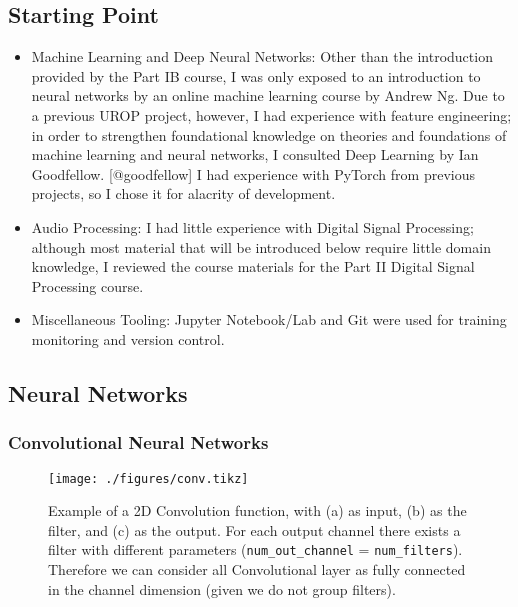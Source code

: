 \documentclass[]{article}
\begin{document}
\hypertarget{starting-point}{%
\subsection{Starting Point}\label{starting-point}}

\begin{itemize}
\item
  Machine Learning and Deep Neural Networks: Other than the introduction
  provided by the Part IB course, I was only exposed to an introduction
  to neural networks by an online machine learning course by Andrew Ng.
  Due to a previous UROP project, however, I had experience with feature
  engineering; in order to strengthen foundational knowledge on theories
  and foundations of machine learning and neural networks, I consulted
  Deep Learning by Ian Goodfellow. {[}@goodfellow{]} I had experience
  with PyTorch from previous projects, so I chose it for alacrity of
  development.
\item
  Audio Processing: I had little experience with Digital Signal
  Processing; although most material that will be introduced below
  require little domain knowledge, I reviewed the course materials for
  the Part II Digital Signal Processing course.
\item
  Miscellaneous Tooling: Jupyter Notebook/Lab and Git were used for
  training monitoring and version control.
\end{itemize}

\hypertarget{neural-networks}{%
\subsection{Neural Networks}\label{neural-networks}}

\hypertarget{convolutional-neural-networks}{%
\subsubsection{Convolutional Neural
Networks}\label{convolutional-neural-networks}}

\begin{figure}[h]
    \texttt{[image: ./figures/conv.tikz]}
    \centering
    \caption{Example of a 2D Convolution function, with (a) as input, (b) as the filter, and (c) as the output. For each output channel there exists a filter with different parameters (\texttt{num\_out\_channel} = \texttt{num\_filters}). Therefore we can consider all Convolutional layer as fully connected in the channel dimension (given we do not group filters).}
\end{figure}
\end{document}
